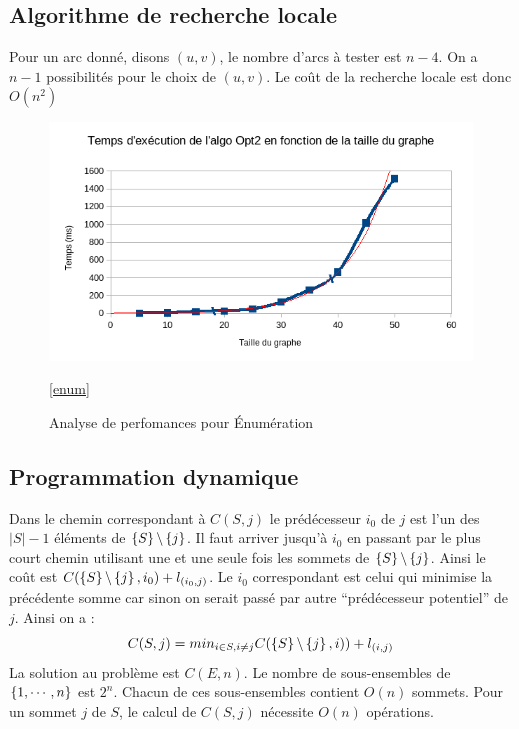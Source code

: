 \documentclass[11pt]{article} \usepackage[top=2cm, bottom=2cm, left=2cm, right=2cm]{geometry}
\begin{document}
\subsection*{Algorithme de recherche locale}
Pour un arc donné, disons $(u,v)$, le nombre d'arcs à tester est $n-4$. On a $n-1$ possibilités pour le choix de
$(u,v)$. Le coût de la recherche locale est donc $O(n^2)$
  \begin{figure}[ht]
\begin{center}
  
  \includegraphics[scale=0.8]{images/exec_opt2.png}
  \caption{Analyse de perfomances pour \'Enumération}
  \ref{enum}
\end{center}
\end{figure}

\subsection*{Programmation dynamique}
Dans le chemin correspondant à $C(S,j)$ le prédécesseur $i_0$ de $j$ est l'un des $|S|-1$ éléments de
$\left\{S\right\} \backslash \left\{j\right\}$. Il faut arriver jusqu'à $i_0$ en passant par le plus court chemin utilisant une et une
seule fois les sommets de $\left\{S\right\} \backslash \left\{j\right\}$. Ainsi le coût est 
$C(\left\{S\right\} \backslash \left\{j\right\},i_0) + l_{(i_0,j)}$. Le $i_0$ correspondant est celui qui minimise la précédente somme car
sinon on serait passé par autre \enquote{prédécesseur potentiel} de $j$. Ainsi on a :
\begin{displaymath}
  C(S,j) = min_{i \in S , i \neq j}C(\left\{S\right\} \backslash \left\{j\right\},i)) + l_{(i,j)}
\end{displaymath}
La solution au problème est $C(E,n)$.
 Le nombre de sous-ensembles de $\left\{1,\cdots,n\right\}$ est $2^n$. Chacun de ces sous-ensembles contient $O(n)$ sommets. Pour
 un sommet $j$ de $S$, le calcul de $C(S,j)$ nécessite $O(n)$ opérations. 
\end{document}
